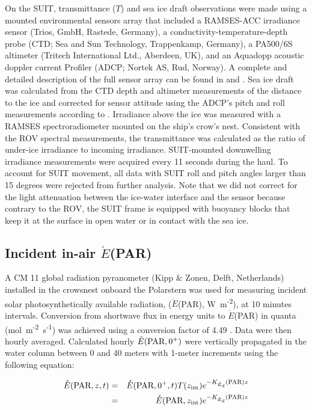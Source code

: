 \documentclass[draft]{agujournal2018}
\newcommand{\kdparscalar}{\ensuremath{K_{\mathring{E}_d}}(\textnormal{PAR})}
\newcommand{\eparscalar}{\ensuremath{\mathring{E}}(\textnormal{PAR})}
\newcommand{\eparzeroscalar}{\ensuremath{\mathring{E}(\textnormal{PAR}, 0^+, t)}}
\newcommand{\wmsquare}{W~m\textsuperscript{-2}}
\newcommand{\micromol}{\textmu mol~m\textsuperscript{-2}~s\textsuperscript{-1}}
\begin{document}
On the SUIT, transmittance ($T$) and sea ice draft observations were made using a mounted environmental sensors array that included a RAMSES-ACC irradiance sensor (Trios, GmbH, Rastede, Germany), a conductivity-temperature-depth probe (CTD; Sea and Sun Technology, Trappenkamp, Germany), a PA500/6S altimeter (Tritech International Ltd., Aberdeen, UK), and an Aquadopp acoustic doppler current Profiler (ADCP; Nortek AS, Rud, Norway). A complete and detailed description of the full sensor array can be found in \citet{David2015} and \citet{Lange2016}. Sea ice draft was calculated from the CTD depth and altimeter measurements of the distance to the ice and corrected for sensor attitude using the ADCP's pitch and roll measurements according to \citet{Lange2016}. Irradiance above the ice was measured with a RAMSES spectroradiometer mounted on the ship's crow's nest. Consistent with the ROV spectral measurements, the transmittance was calculated as the ratio of under-ice irradiance to incoming irradiance. SUIT-mounted downwelling irradiance measurements were acquired every 11 seconds during the haul. To account for SUIT movement, all data with SUIT roll and pitch angles larger than 15 degrees were rejected from further analysis. Note that we did not correct for the light attenuation between the ice-water interface and the sensor because contrary to the ROV, the SUIT frame is equipped with buoyancy blocks  that keep it at the surface in open water or in contact with the sea ice. 

\subsection{Incident in-air \eparscalar{}}

A CM 11 global radiation pyranometer (Kipp \& Zonen, Delft, Netherlands) installed in the crowsnest onboard the Polarstern was used for measuring incident solar photosynthetically available radiation, (\eparscalar{}, \wmsquare), at 10 minutes intervals. Conversion from shortwave flux in energy units to \eparscalar{} in quanta (\micromol{}) was achieved using a conversion factor of 4.49 \citep{McCree1972}. Data were then hourly averaged. Calculated hourly $\mathring{E}(\textnormal{PAR}, 0^+)$ were vertically propagated in the water column between 0 and 40 meters with 1-meter increments using the following equation:

\begin{linenomath*}
    \begin{eqnarray}
        \mathring{E}(\textnormal{PAR}, z, t) & = & \eparzeroscalar{}T(z_{\textnormal{int}})e^{-\kdparscalar{}z} \\
        & = & \mathring{E}(\textnormal{PAR}, z_\textnormal{int})e^{-\kdparscalar{}z} \nonumber
    \end{eqnarray}
\end{linenomath*}
\end{document}
